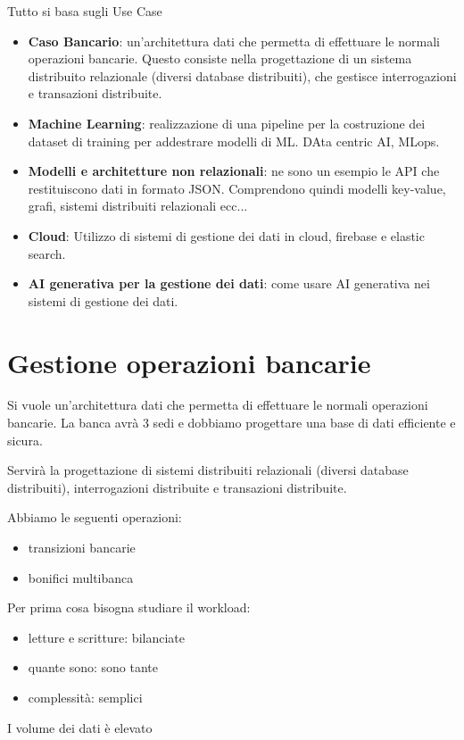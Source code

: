 Tutto si basa sugli Use Case
\begin{itemize}
    \item \textbf{Caso Bancario}: un'architettura dati che permetta di effettuare
          le normali operazioni bancarie. Questo consiste nella progettazione di
          un sistema distribuito relazionale (diversi database distribuiti), che
          gestisce interrogazioni e transazioni distribuite.
    \item \textbf{Machine Learning}: realizzazione di una pipeline per la
          costruzione dei dataset di training per addestrare modelli di ML.
          DAta centric AI, MLops.
    \item \textbf{Modelli e architetture non relazionali}: ne sono un esempio
          le API che restituiscono dati in formato JSON. Comprendono quindi
          modelli key-value, grafi, sistemi distribuiti relazionali ecc...
    \item \textbf{Cloud}: Utilizzo di sistemi di gestione dei dati in cloud,
          firebase e elastic search.
    \item \textbf{AI generativa per la gestione dei dati}: come usare AI
          generativa nei sistemi di gestione dei dati.
\end{itemize}
\section{Gestione operazioni bancarie}
Si vuole un'architettura dati che permetta di effettuare le normali operazioni
bancarie. La banca avrà $3$ sedi e dobbiamo progettare una base di dati efficiente 
e sicura.

Servirà la progettazione di sistemi distribuiti relazionali (diversi
database distribuiti), interrogazioni distribuite e transazioni distribuite.

Abbiamo le seguenti operazioni:
\begin{itemize}
    \item transizioni bancarie
    \item bonifici multibanca
\end{itemize}
Per prima cosa bisogna studiare il workload:
\begin{itemize}
    \item letture e scritture: bilanciate
    \item quante sono: sono tante
    \item complessità: semplici
\end{itemize}
I volume dei dati è elevato


